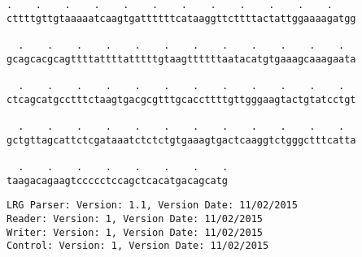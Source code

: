 \documentclass{article}
\begin{document}
\begin{Verbatim}[fontfamily=courier]
  .    .    .    .    .    .    .    .    .    .    .    .  
cttttgttgtaaaaatcaagtgattttttcataaggttcttttactattggaaaagatgg

  .    .    .    .    .    .    .    .    .    .    .    .  
gcagcacgcagttttattttatttttgtaagttttttaatacatgtgaaagcaaagaata

  .    .    .    .    .    .    .    .    .    .    .    .  
ctcagcatgcctttctaagtgacgcgtttgcaccttttgttgggaagtactgtatcctgt

  .    .    .    .    .    .    .    .    .    .    .    .  
gctgttagcattctcgataaatctctctgtgaaagtgactcaaggtctgggctttcatta

  .    .    .    .    .    .    .    .
taagacagaagtccccctccagctcacatgacagcatg
\end{Verbatim}
\newpage
\begin{Verbatim}[fontfamily=courier]
LRG Parser: Version: 1.1, Version Date: 11/02/2015
Reader: Version: 1, Version Date: 11/02/2015
Writer: Version: 1, Version Date: 11/02/2015
Control: Version: 1, Version Date: 11/02/2015
\end{Verbatim}
\end{document}
